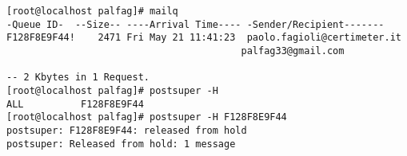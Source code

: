   \begin{verbatim}
[root@localhost palfag]# mailq
-Queue ID-  --Size-- ----Arrival Time---- -Sender/Recipient-------
F128F8E9F44!    2471 Fri May 21 11:41:23  paolo.fagioli@certimeter.it
                                         palfag33@gmail.com

-- 2 Kbytes in 1 Request.
[root@localhost palfag]# postsuper -H 
ALL          F128F8E9F44  
[root@localhost palfag]# postsuper -H F128F8E9F44 
postsuper: F128F8E9F44: released from hold
postsuper: Released from hold: 1 message
  \end{verbatim}